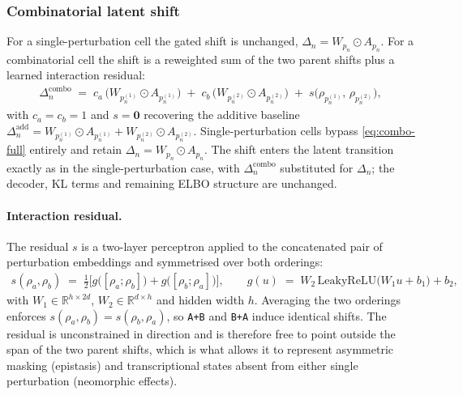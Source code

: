 \subsubsection{Combinatorial latent shift}
\label{sec:combo-shift}

For a single-perturbation cell the gated shift is unchanged,
$\Delta_n = W_{p_n} \odot A_{p_n}$. For a combinatorial cell the shift is a reweighted sum of the two
parent shifts plus a learned interaction residual:
\begin{align}
  \Delta_n^{\mathrm{combo}}
  \;=\;
  c_a\,\big(W_{p_n^{(1)}} \odot A_{p_n^{(1)}}\big)
  \;+\;
  c_b\,\big(W_{p_n^{(2)}} \odot A_{p_n^{(2)}}\big)
  \;+\;
  s\big(\rho_{p_n^{(1)}},\, \rho_{p_n^{(2)}}\big),
  \label{eq:combo-full}
\end{align}
with $c_a = c_b = 1$ and $s = \mathbf{0}$ recovering the additive baseline
$\Delta_n^{\mathrm{add}} = W_{p_n^{(1)}} \odot A_{p_n^{(1)}} + W_{p_n^{(2)}} \odot A_{p_n^{(2)}}$.
Single-perturbation cells bypass \eqref{eq:combo-full} entirely and retain
$\Delta_n = W_{p_n} \odot A_{p_n}$. The shift enters the latent transition exactly as in the
single-perturbation case, with $\Delta_n^{\mathrm{combo}}$ substituted for $\Delta_n$; the decoder,
KL terms and remaining ELBO structure are unchanged.

\paragraph{Interaction residual.}
The residual $s$ is a two-layer perceptron applied to the concatenated pair of perturbation
embeddings and symmetrised over both orderings:
\begin{align}
  s(\rho_a, \rho_b)
  \;=\;
  \tfrac{1}{2}\Big[
    g\big([\rho_a;\rho_b]\big) + g\big([\rho_b;\rho_a]\big)
  \Big],
  \qquad
  g(u) \;=\; W_2\,\mathrm{LeakyReLU}\big(W_1 u + b_1\big) + b_2,
  \label{eq:syn-shift}
\end{align} 
with $W_1 \in \mathbb{R}^{h \times 2d}$, $W_2 \in \mathbb{R}^{d \times h}$ and hidden width $h$.
Averaging the two orderings enforces $s(\rho_a,\rho_b) = s(\rho_b,\rho_a)$, so \texttt{A+B} and
\texttt{B+A} induce identical shifts. The residual is unconstrained in direction and is therefore
free to point outside the span of the two parent shifts, which is what allows it to represent
asymmetric masking (epistasis) and transcriptional states absent from either single perturbation
(neomorphic effects).

